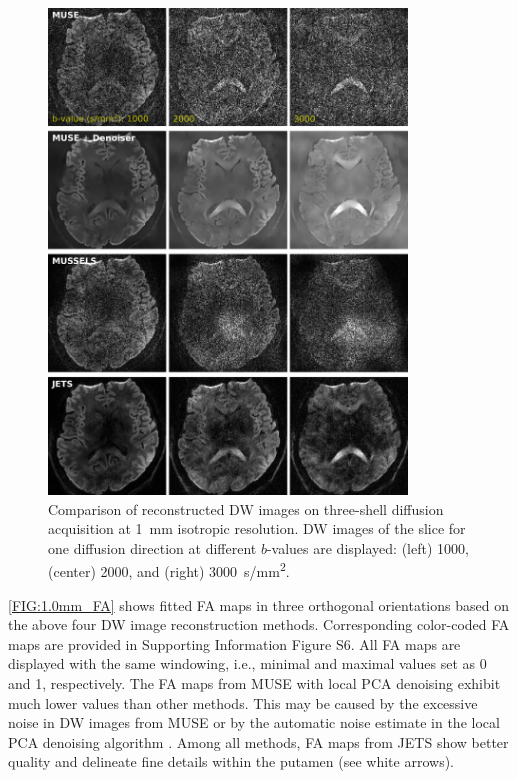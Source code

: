 \documentclass[preprint,12pt,authoryear,review]{elsarticle}
\begin{document}
	\begin{figure}
		\centering
		\includegraphics[width=0.85\textwidth]{../figures/fig3.png}
		\caption{Comparison of reconstructed DW images on
			three-shell diffusion acquisition at
			\SI{1}{\milli\meter} isotropic resolution.
			DW images of the  slice for one diffusion direction at different $b$-values are displayed:
				(left) 1000, (center) 2000, and (right) 3000~\si{s/mm^2}.}
		\label{FIG:1.0mm_DWI}
	\end{figure}

	\cref{FIG:1.0mm_FA} shows fitted FA maps
	in three orthogonal orientations
	based on the above four DW image reconstruction methods.
	Corresponding color-coded FA maps are provided
	in Supporting Information Figure S6.
        All FA maps are displayed with the same windowing,
        i.e., minimal and maximal values set as 0 and 1, respectively.
        The FA maps from MUSE with local PCA denoising
        exhibit much lower values than other methods.
        This may be caused by the excessive noise in DW images from MUSE
        or by the automatic noise estimate in the local PCA denoising algorithm
        \citep{veraart_2016_denoise}.
	Among all methods, FA maps from JETS show better quality
	and delineate fine details within the putamen (see white arrows).
\end{document}
